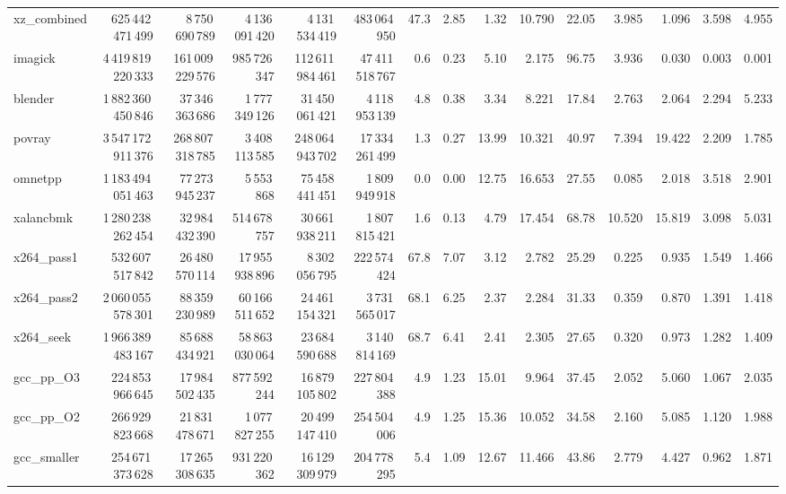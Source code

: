 \documentclass[9pt,landscape,a4paper]{article}
\begin{document}
\begin{adjustbox}{max width=\textwidth, max totalheight=0.50\textheight}
\begin{tabular}{lrrrrrrrrrrrrrr}
xz\_combined & 625\,442\,471\,499 & 8\,750\,690\,789 & 4\,136\,091\,420 & 4\,131\,534\,419 & 483\,064\,950 & 47.3 & 2.85 & 1.32 & 10.790 & 22.05 & 3.985 & 1.096 & 3.598 & 4.955 \\
imagick & 4\,419\,819\,220\,333 & 161\,009\,229\,576 & 985\,726\,347 & 112\,611\,984\,461 & 47\,411\,518\,767 & 0.6 & 0.23 & 5.10 & 2.175 & 96.75 & 3.936 & 0.030 & 0.003 & 0.001 \\
blender & 1\,882\,360\,450\,846 & 37\,346\,363\,686 & 1\,777\,349\,126 & 31\,450\,061\,421 & 4\,118\,953\,139 & 4.8 & 0.38 & 3.34 & 8.221 & 17.84 & 2.763 & 2.064 & 2.294 & 5.233 \\
povray & 3\,547\,172\,911\,376 & 268\,807\,318\,785 & 3\,408\,113\,585 & 248\,064\,943\,702 & 17\,334\,261\,499 & 1.3 & 0.27 & 13.99 & 10.321 & 40.97 & 7.394 & 19.422 & 2.209 & 1.785 \\
omnetpp & 1\,183\,494\,051\,463 & 77\,273\,945\,237 & 5\,553\,868 & 75\,458\,441\,451 & 1\,809\,949\,918 & 0.0 & 0.00 & 12.75 & 16.653 & 27.55 & 0.085 & 2.018 & 3.518 & 2.901 \\
xalancbmk & 1\,280\,238\,262\,454 & 32\,984\,432\,390 & 514\,678\,757 & 30\,661\,938\,211 & 1\,807\,815\,421 & 1.6 & 0.13 & 4.79 & 17.454 & 68.78 & 10.520 & 15.819 & 3.098 & 5.031 \\
x264\_pass1 & 532\,607\,517\,842 & 26\,480\,570\,114 & 17\,955\,938\,896 & 8\,302\,056\,795 & 222\,574\,424 & 67.8 & 7.07 & 3.12 & 2.782 & 25.29 & 0.225 & 0.935 & 1.549 & 1.466 \\
x264\_pass2 & 2\,060\,055\,578\,301 & 88\,359\,230\,989 & 60\,166\,511\,652 & 24\,461\,154\,321 & 3\,731\,565\,017 & 68.1 & 6.25 & 2.37 & 2.284 & 31.33 & 0.359 & 0.870 & 1.391 & 1.418 \\
x264\_seek & 1\,966\,389\,483\,167 & 85\,688\,434\,921 & 58\,863\,030\,064 & 23\,684\,590\,688 & 3\,140\,814\,169 & 68.7 & 6.41 & 2.41 & 2.305 & 27.65 & 0.320 & 0.973 & 1.282 & 1.409 \\
gcc\_pp\_O3 & 224\,853\,966\,645 & 17\,984\,502\,435 & 877\,592\,244 & 16\,879\,105\,802 & 227\,804\,388 & 4.9 & 1.23 & 15.01 & 9.964 & 37.45 & 2.052 & 5.060 & 1.067 & 2.035 \\
gcc\_pp\_O2 & 266\,929\,823\,668 & 21\,831\,478\,671 & 1\,077\,827\,255 & 20\,499\,147\,410 & 254\,504\,006 & 4.9 & 1.25 & 15.36 & 10.052 & 34.58 & 2.160 & 5.085 & 1.120 & 1.988 \\
gcc\_smaller & 254\,671\,373\,628 & 17\,265\,308\,635 & 931\,220\,362 & 16\,129\,309\,979 & 204\,778\,295 & 5.4 & 1.09 & 12.67 & 11.466 & 43.86 & 2.779 & 4.427 & 0.962 & 1.871 \\

\end{tabular}
\end{adjustbox}
\end{document}
